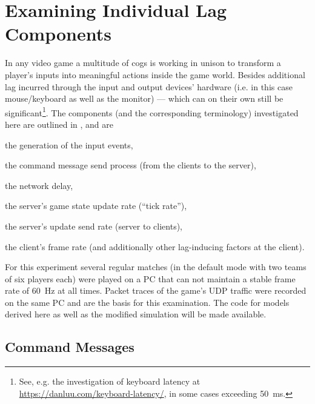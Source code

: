 \section{Examining Individual Lag Components}
\label{sec:lagmodel}


In any video game a multitude of cogs is working in unison to transform a player's inputs into meaningful actions inside the game world. Besides additional lag incurred through the input and output devices' hardware (i.e. in this case mouse/keyboard as well as the monitor) --- which can on their own still be significant\footnote{See, e.g. the investigation of keyboard latency at \url{https://danluu.com/keyboard-latency/}, in some cases exceeding \SI{50}{\milli\second}.}. The components (and the corresponding terminology) investigated here are outlined in \cite{Metzger+2016}, and are 
\begin{enumerate*}[label=(\alph*)]
	\item the generation of the input events,
	\item the command message send process (from the clients to the server),
	\item the network delay,
	\item the server's game state update rate (``tick rate''),
	\item the server's update send rate (server to clients),
	\item the client's frame rate (and additionally other lag-inducing factors at the client).
\end{enumerate*}
%
%
For this experiment several regular matches (in the default mode with two teams of six players each) were played on a PC that can not maintain a stable frame rate of \SI{60}{\hertz} at all times. Packet traces of the game's UDP traffic were recorded on the same PC and are the basis for this examination. The code for models derived here as well as the modified simulation will be made available.


\subsection{Command Messages}

